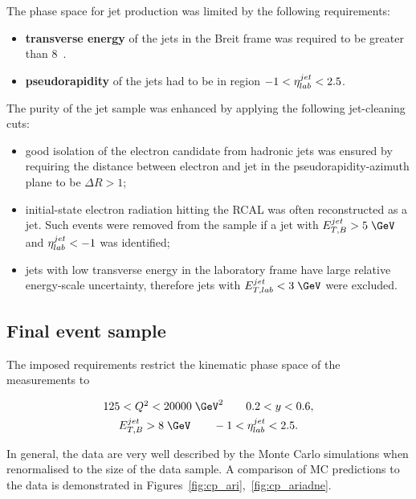 The phase space for jet production was limited by the following requirements:
\begin{itemize}
	\item \textbf{transverse energy} of the jets in the Breit frame was required to be greater than 8~\GeV.
	\item \textbf{pseudorapidity} of the jets had to be in region $-1<\mbox{$\eta^{jet}_{lab}$}<2.5$.
\end{itemize}
The purity of the jet sample was enhanced by applying the following jet-cleaning cuts:

\begin{itemize}
	\item good isolation of the electron candidate from hadronic jets was ensured by requiring the distance between electron and jet in the pseudorapidity-azimuth plane to be $\Delta R > 1$;
	\item initial-state electron radiation hitting the RCAL was often reconstructed as a jet. Such events were removed from the sample if a jet with $\etjetb > 5\;\GeV$ and $\mbox{$\eta^{jet}_{lab}$} < -1$ was identified;
	\item jets with low transverse energy in the laboratory frame have large relative energy-scale uncertainty, therefore jets with $\etjetlab < 3\;\GeV$ were excluded.
\end{itemize}

\subsection{Final event sample}
\label{subsec:eventsampletab}
The imposed requirements restrict the kinematic phase space of the measurements to

\begin{gather}
125 < \qsq < 20000\;\GeV^2 \qquad 0.2 < y < 0.6, \\
\etjetb > 8\;\GeV \qquad -1 < \etajetlab < 2.5.
\end{gather}

In general, the data are very well described by the Monte Carlo simulations when renormalised to the size of the data sample. A comparison of MC predictions to the data is demonstrated in Figures~\ref{fig:cp_ari},~\ref{fig:cp_ariadne}. 


